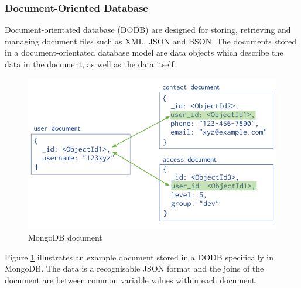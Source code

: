 \subsubsection{Document-Oriented Database}
Document-orientated database (DODB) are designed for storing, retrieving and managing document files such as XML, JSON and BSON. The documents stored in a document-orientated database model are data objects which describe the data in the document, as well as the data itself. \begin{figure}[h]\begin{center}\includegraphics[width=0.75\linewidth]{images/mongodbmodel}\caption{MongoDB document}\label{fig:mongo}\end{center}\end{figure} Figure \ref{fig:mongo} illustrates an example document stored in a DODB specifically in MongoDB. The data is a recognisable JSON format and the joins of the document are between common variable values within each document.

